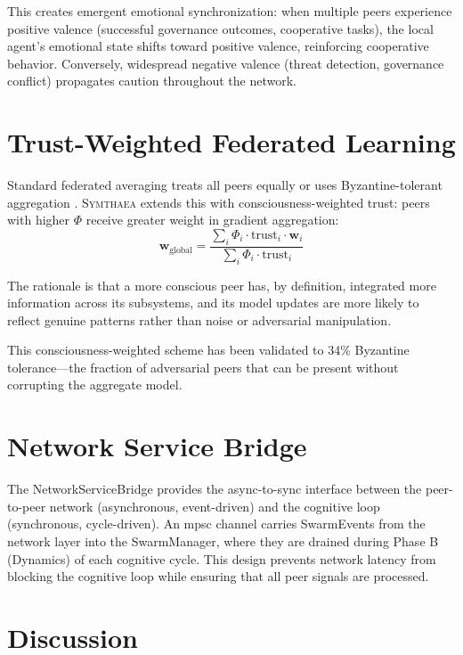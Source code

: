 \documentclass[12pt]{book}
\newcommand{\symthaea}{\textsc{Symthaea}}
\begin{document}
This creates emergent emotional synchronization: when multiple peers experience positive valence (successful governance outcomes, cooperative tasks), the local agent's emotional state shifts toward positive valence, reinforcing cooperative behavior. Conversely, widespread negative valence (threat detection, governance conflict) propagates caution throughout the network.

\section{Trust-Weighted Federated Learning}

Standard federated averaging \citep{mcmahan2017} treats all peers equally or uses Byzantine-tolerant aggregation \citep{blanchard2017}. \symthaea{} extends this with consciousness-weighted trust: peers with higher $\Phi$ receive greater weight in gradient aggregation:
\begin{equation}
\mathbf{w}_{\text{global}} = \frac{\sum_i \Phi_i \cdot \text{trust}_i \cdot \mathbf{w}_i}{\sum_i \Phi_i \cdot \text{trust}_i}
\end{equation}

The rationale is that a more conscious peer has, by definition, integrated more information across its subsystems, and its model updates are more likely to reflect genuine patterns rather than noise or adversarial manipulation.

This consciousness-weighted scheme has been validated to 34\% Byzantine tolerance---the fraction of adversarial peers that can be present without corrupting the aggregate model.

\section{Network Service Bridge}

The NetworkServiceBridge provides the async-to-sync interface between the peer-to-peer network (asynchronous, event-driven) and the cognitive loop (synchronous, cycle-driven). An mpsc channel carries SwarmEvents from the network layer into the SwarmManager, where they are drained during Phase B (Dynamics) of each cognitive cycle. This design prevents network latency from blocking the cognitive loop while ensuring that all peer signals are processed.

\section{Discussion}
\end{document}
